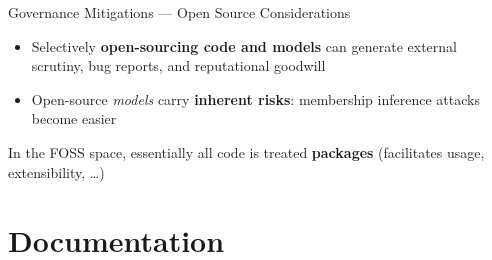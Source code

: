 \documentclass[
  ignorenonframetext,
]{beamer}
\providecommand{\tightlist}{%
  \setlength{\itemsep}{0pt}\setlength{\parskip}{0pt}}
\begin{document}
\begin{frame}{Governance Mitigations --- Open Source Considerations}
\label{governance-mitigations-open-source-considerations}
\begin{itemize}
\tightlist
\item
  Selectively \textbf{open-sourcing code and models} can generate
  external scrutiny, bug reports, and reputational goodwill
\item
  Open-source \emph{models} carry \textbf{inherent risks}: membership
  inference attacks become easier
\end{itemize}

\begin{tcolorbox}[enhanced jigsaw, coltitle=black, opacityback=0, toprule=.15mm, breakable, left=2mm, rightrule=.15mm, titlerule=0mm, colframe=quarto-callout-tip-color-frame, opacitybacktitle=0.6, bottomtitle=1mm, toptitle=1mm, bottomrule=.15mm, title=\textcolor{quarto-callout-tip-color}{\faLightbulb}\hspace{0.5em}{FOSS Practices}, arc=.35mm, leftrule=.75mm, colback=white, colbacktitle=quarto-callout-tip-color!10!white]

In the FOSS space, essentially all code is treated \textbf{packages}
(facilitates usage, extensibility, \ldots)

\end{tcolorbox}
\end{frame}

\section{Documentation}\label{documentation}
\end{document}
